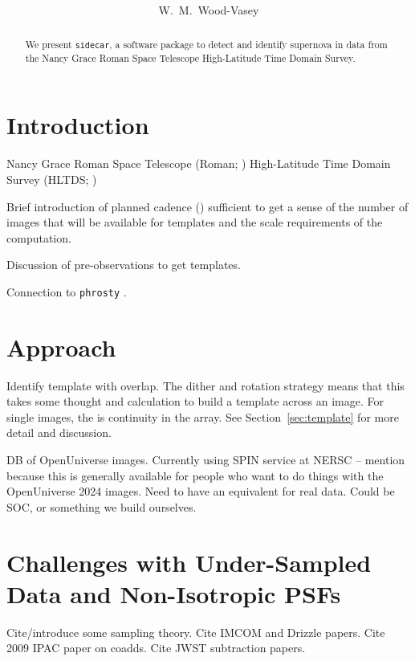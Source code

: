 \documentclass[preprint]{aastex7}
\newcommand{\code}[1]{\texttt{#1}}
\begin{document}
\title{
}

\author[0000-0001-7113-1233]{W.~M.~Wood-Vasey}

\begin{abstract}
We present \code{sidecar}, a software package to detect and identify supernova in data from the Nancy Grace Roman Space Telescope High-Latitude Time Domain Survey.
\end{abstract}

\section{Introduction}

Nancy Grace Roman Space Telescope (Roman; \cite{Roman})
High-Latitude Time Domain Survey (HLTDS; \cite{HLTDS})

Brief introduction of planned cadence (\cite{HLTDS_cadence}) sufficient to get a sense of the number of images that will be available for templates and the scale requirements of the computation.

Discussion of pre-observations to get templates.

Connection to \code{phrosty} \cite{phrosty}.

\section{Approach}

Identify template with overlap.  The dither and rotation strategy means that this takes some thought and calculation to build a template across an image.  For single images, the is continuity in the array. See Section~\ref{sec:template} for more detail and discussion.


DB of OpenUniverse images.  Currently using SPIN service at NERSC -- mention because this is generally available for people who want to do things with the OpenUniverse 2024 images.  Need to have an equivalent for real data.  Could be SOC, or something we build ourselves.

\section{Challenges with Under-Sampled Data and Non-Isotropic PSFs}

Cite/introduce some sampling theory.
Cite IMCOM and Drizzle papers.
Cite 2009 IPAC paper on coadds.
Cite JWST subtraction papers.
\end{document}
